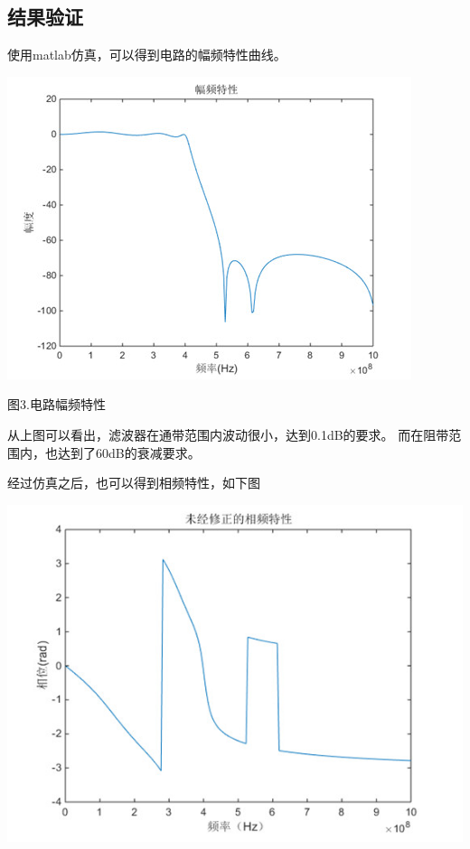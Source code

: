 \documentclass{article}
\begin{document}
\begin{CJK}{UTF8}{gbsn}
\section{结果验证}
\qquad 使用matlab仿真，可以得到电路的幅频特性曲线。
\begin{center}
\includegraphics[scale=0.7]{frequency}

图3.电路幅频特性
\end{center}

从上图可以看出，滤波器在通带范围内波动很小，达到0.1dB的要求。
而在阻带范围内，也达到了60dB的衰减要求。

经过仿真之后，也可以得到相频特性，如下图

\begin{center}
\includegraphics[scale=0.5]{original_phase}


\end{center}
\end{CJK}
\end{document}

